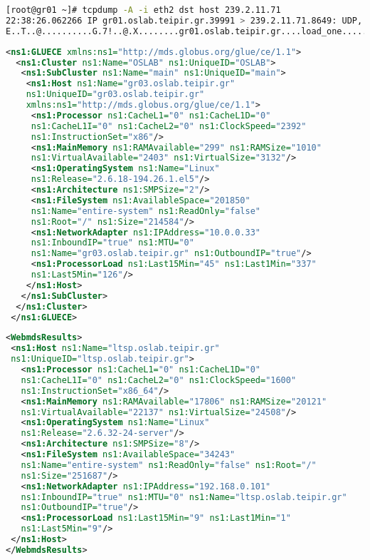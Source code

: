 \begin{lstlisting}[language=bash,caption=XDR sample,label=tcpdump]
[root@gr01 ~]# tcpdump -A -i eth2 dst host 239.2.11.71
22:38:26.062266 IP gr01.oslab.teipir.gr.39991 > 239.2.11.71.8649: UDP, length 56
E..T..@..........G.7!..@.X........gr01.oslab.teipir.gr....load_one........%.2f..
\end{lstlisting}

\begin{lstlisting}[language=XML,caption=WSRF query output,label=wsrfquery]
 <ns1:GLUECE xmlns:ns1="http://mds.globus.org/glue/ce/1.1">
  <ns1:Cluster ns1:Name="OSLAB" ns1:UniqueID="OSLAB">
   <ns1:SubCluster ns1:Name="main" ns1:UniqueID="main">
    <ns1:Host ns1:Name="gr03.oslab.teipir.gr" 
    ns1:UniqueID="gr03.oslab.teipir.gr" 
    xmlns:ns1="http://mds.globus.org/glue/ce/1.1">
     <ns1:Processor ns1:CacheL1="0" ns1:CacheL1D="0" 
     ns1:CacheL1I="0" ns1:CacheL2="0" ns1:ClockSpeed="2392" 
     ns1:InstructionSet="x86"/>
     <ns1:MainMemory ns1:RAMAvailable="299" ns1:RAMSize="1010" 
     ns1:VirtualAvailable="2403" ns1:VirtualSize="3132"/>
     <ns1:OperatingSystem ns1:Name="Linux"
     ns1:Release="2.6.18-194.26.1.el5"/>
     <ns1:Architecture ns1:SMPSize="2"/>
     <ns1:FileSystem ns1:AvailableSpace="201850" 
     ns1:Name="entire-system" ns1:ReadOnly="false"
     ns1:Root="/" ns1:Size="214584"/>
     <ns1:NetworkAdapter ns1:IPAddress="10.0.0.33" 
     ns1:InboundIP="true" ns1:MTU="0" 
     ns1:Name="gr03.oslab.teipir.gr" ns1:OutboundIP="true"/>
     <ns1:ProcessorLoad ns1:Last15Min="45" ns1:Last1Min="337"
     ns1:Last5Min="126"/>
    </ns1:Host>
   </ns1:SubCluster>
  </ns1:Cluster>
 </ns1:GLUECE>
\end{lstlisting}

\begin{lstlisting}[language=XML,caption=WebMDS results from XPath query,label=xpath_result]
<WebmdsResults>
 <ns1:Host ns1:Name="ltsp.oslab.teipir.gr" 
 ns1:UniqueID="ltsp.oslab.teipir.gr">
   <ns1:Processor ns1:CacheL1="0" ns1:CacheL1D="0" 
   ns1:CacheL1I="0" ns1:CacheL2="0" ns1:ClockSpeed="1600" 
   ns1:InstructionSet="x86_64"/>
   <ns1:MainMemory ns1:RAMAvailable="17806" ns1:RAMSize="20121" 
   ns1:VirtualAvailable="22137" ns1:VirtualSize="24508"/>
   <ns1:OperatingSystem ns1:Name="Linux" 
   ns1:Release="2.6.32-24-server"/>
   <ns1:Architecture ns1:SMPSize="8"/>
   <ns1:FileSystem ns1:AvailableSpace="34243" 
   ns1:Name="entire-system" ns1:ReadOnly="false" ns1:Root="/" 
   ns1:Size="251687"/>
   <ns1:NetworkAdapter ns1:IPAddress="192.168.0.101" 
   ns1:InboundIP="true" ns1:MTU="0" ns1:Name="ltsp.oslab.teipir.gr" 
   ns1:OutboundIP="true"/>
   <ns1:ProcessorLoad ns1:Last15Min="9" ns1:Last1Min="1" 
   ns1:Last5Min="9"/>
 </ns1:Host>
</WebmdsResults>
\end{lstlisting}

